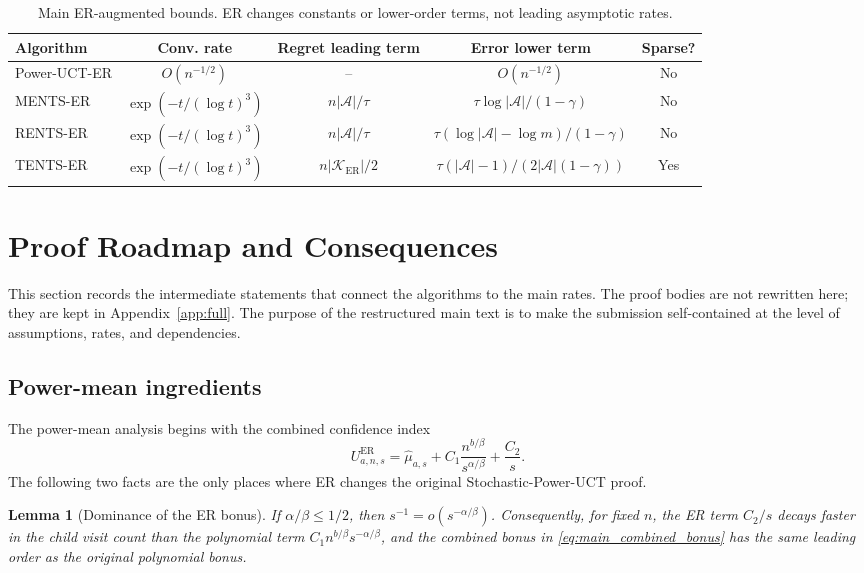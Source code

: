 \documentclass{article}
\newtheorem{lemma}[theorem]{Lemma}
\newcommand{\muhat}{\widehat{\mu}}
\begin{document}
\begin{table}[t]
\centering
\caption{Main ER-augmented bounds.  ER changes constants or lower-order terms, not leading asymptotic rates.}
\label{tab:main_summary}
\small
\begin{tabular}{lcccc}
\toprule
Algorithm & Conv. rate & Regret leading term & Error lower term & Sparse? \\
\midrule
Power-UCT-ER & $O(n^{-1/2})$ & -- & $O(n^{-1/2})$ & No \\
MENTS-ER & $\exp(-t/(\log t)^3)$ & $n|\mathcal A|/\tau$ & $\tau\log|\mathcal A|/(1-\gamma)$ & No \\
RENTS-ER & $\exp(-t/(\log t)^3)$ & $n|\mathcal A|/\tau$ & $\tau(\log|\mathcal A|-\log m)/(1-\gamma)$ & No \\
TENTS-ER & $\exp(-t/(\log t)^3)$ & $n|\mathcal K_{\mathrm{ER}}|/2$ & $\tau(|\mathcal A|-1)/(2|\mathcal A|(1-\gamma))$ & Yes \\
\bottomrule
\end{tabular}
\end{table}



\section{Proof Roadmap and Consequences}
\label{sec:main_proof_roadmap}
This section records the intermediate statements that connect the algorithms to the main rates.  The proof bodies are not rewritten here; they are kept in Appendix~\ref{app:full}.  The purpose of the restructured main text is to make the submission self-contained at the level of assumptions, rates, and dependencies.

\subsection{Power-mean ingredients}
The power-mean analysis begins with the combined confidence index
\[
U^{\mathrm{ER}}_{a,n,s}=\muhat_{a,s}+C_1\frac{n^{b/\beta}}{s^{\alpha/\beta}}+\frac{C_2}{s}.
\]
The following two facts are the only places where ER changes the original Stochastic-Power-UCT proof.

\begin{lemma}[Dominance of the ER bonus]
\label{lem:main_dominance_statement}
If $\alpha/\beta\leq1/2$, then $s^{-1}=o(s^{-\alpha/\beta})$.  Consequently, for fixed $n$, the ER term $C_2/s$ decays faster in the child visit count than the polynomial term $C_1n^{b/\beta}s^{-\alpha/\beta}$, and the combined bonus in \eqref{eq:main_combined_bonus} has the same leading order as the original polynomial bonus.
\end{lemma}
\end{document}
